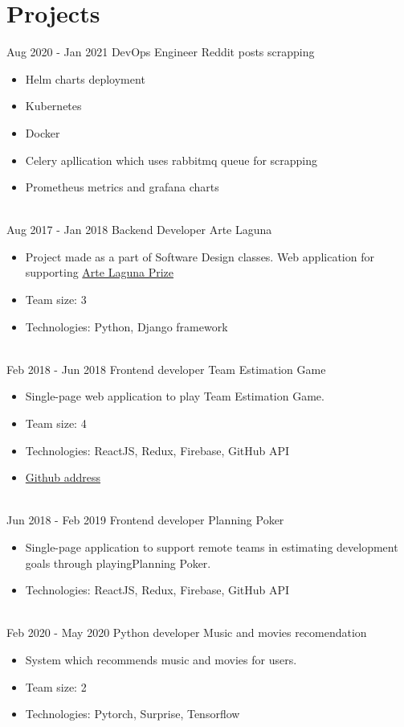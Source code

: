 \documentclass[letterpaper]{tenseconds} %
\begin{document}
\section{Projects}

\begin{twenty} %
	\twentyitem
	{Aug 2020 -}
	{Jan 2021}
	{DevOps Engineer}
	{Reddit posts scrapping}
	{}
	{\begin{itemize}
		\item Helm charts deployment
		\item Kubernetes
		\item Docker
		\item Celery apllication which uses rabbitmq queue for scrapping
		\item Prometheus metrics and grafana charts
		\end{itemize}}
	\\
	\twentyitem
	{Aug 2017 -}
	{Jan 2018}
	{Backend Developer}
	{Arte Laguna}
	{}
	{\begin{itemize}
		\item Project made as a part of Software Design classes. Web application for supporting {\href{https://github.com/kk0walski/konkurs}{Arte Laguna Prize}}
		\item Team size: 3
		\item Technologies: Python, Django framework
		\end{itemize}}
	\\
	\twentyitem
	{Feb 2018 -}
	{Jun 2018}
	{Frontend developer}
	{Team Estimation Game}
	{}
	{\begin{itemize}
		\item Single-page web application to play Team Estimation Game.
		\item Team size: 4
		\item Technologies: ReactJS, Redux, Firebase, GitHub API
		\item {\href{https://www.github.com/kk0walski/reactiveTeamEstimationGame}{Github address}}
		\end{itemize}}
	\\
	\twentyitem
	{Jun 2018 -}
	{Feb 2019}
	{Frontend developer}
	{Planning Poker}
	{}
	{\begin{itemize}
		\item Single-page application to support remote teams in estimating development goals through playingPlanning Poker.
		\item Technologies: ReactJS, Redux, Firebase, GitHub API
		\end{itemize}}
	\\
	\twentyitem
	{Feb 2020 -}
	{May 2020}
	{Python developer}
	{Music and movies recomendation}
	{}
	{\begin{itemize}
		\item System which recommends music and movies for users.
		\item Team size: 2
		\item Technologies: Pytorch, Surprise, Tensorflow
		\end{itemize}}
\end{twenty}
\end{document}
